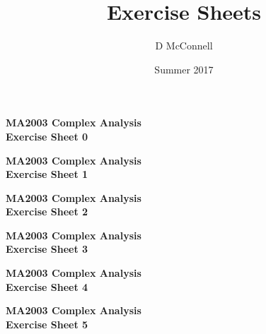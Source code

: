 \documentclass[oneside, 11pt]{article}
\title{Exercise Sheets}
\author{D McConnell}
\date{Summer 2017}
\newcommand{\exercisetitle}[1]{\begin{center}{\large\bf MA2003 Complex Analysis \\#1}\end{center}\bigskip}
\begin{document}
\exercisetitle{Exercise Sheet 0}

\newpage
\exercisetitle{Exercise Sheet 1}

\newpage
\exercisetitle{Exercise Sheet 2}

\newpage
\exercisetitle{Exercise Sheet 3}

\newpage
\exercisetitle{Exercise Sheet 4}

\newpage
\exercisetitle{Exercise Sheet 5}

\end{document}
